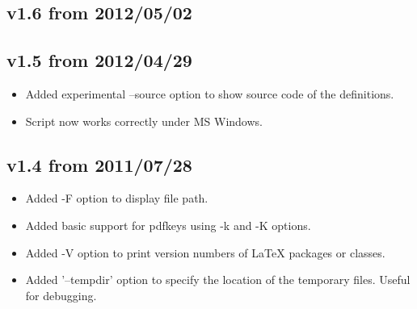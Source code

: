 \documentclass{ydoc}
\begin{document}
\subsection*{v1.6 from 2012/05/02}

\subsection*{v1.5 from 2012/04/29}
\begin{itemize}
 \item Added experimental --source option to show source code of the definitions.
 \item Script now works correctly under MS Windows.
\end{itemize}

\subsection*{v1.4 from 2011/07/28}
\begin{itemize}
 \item Added -F option to display file path.
 \item Added basic support for pdfkeys using -k and -K options.
 \item Added -V option to print version numbers of LaTeX packages or classes.
 \item Added '--tempdir' option to specify the location of the temporary files. Useful for debugging.
\end{itemize}
\end{document}
